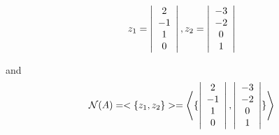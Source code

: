 \documentclass{article}
\begin{document}
\newcommand{\myzTwo}{
  \left| \begin{array}{ccccc}
    -3 \\
    -2 \\
    0 \\
    1 \\
  \end{array} \right|
}

\begin{equation}
  z_1 = \myzOne, z_2 = \myzTwo
\end{equation}

and
\begin{equation}
  \mathcal{N}(A) = <\{z_1,z_2\}>=
  \left< \{ \myzOne, \myzTwo \} \right>
\end{equation}
\end{document}
